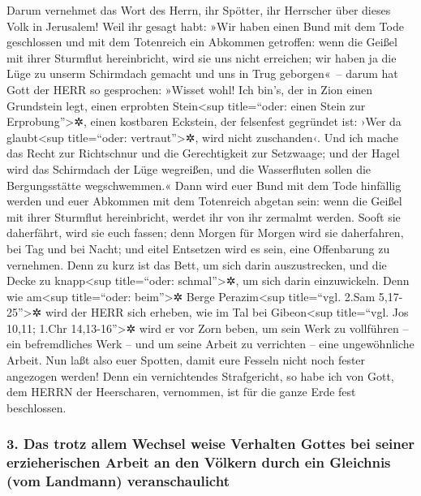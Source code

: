 Darum vernehmet das Wort des Herrn, ihr Spötter, ihr
Herrscher über dieses Volk in Jerusalem! Weil ihr gesagt
habt: »Wir haben einen Bund mit dem Tode geschlossen und mit dem
Totenreich ein Abkommen getroffen: wenn die Geißel mit ihrer Sturmflut
hereinbricht, wird sie uns nicht erreichen; wir haben ja die Lüge zu
unserm Schirmdach gemacht und uns in Trug geborgen«~--
darum hat Gott der HERR so gesprochen: »Wisset wohl! Ich
bin's, der in Zion einen Grundstein legt, einen erprobten
Stein\textless sup title=``oder: einen Stein zur
Erprobung''\textgreater✲, einen kostbaren Eckstein, der felsenfest
gegründet ist: ›Wer da glaubt\textless sup title=``oder:
vertraut''\textgreater✲, wird nicht zuschanden‹. Und ich
mache das Recht zur Richtschnur und die Gerechtigkeit zur Setzwaage; und
der Hagel wird das Schirmdach der Lüge wegreißen, und die Wasserfluten
sollen die Bergungsstätte wegschwemmen.« Dann wird euer
Bund mit dem Tode hinfällig werden und euer Abkommen mit dem Totenreich
abgetan sein: wenn die Geißel mit ihrer Sturmflut hereinbricht, werdet
ihr von ihr zermalmt werden. Sooft sie daherfährt, wird
sie euch fassen; denn Morgen für Morgen wird sie daherfahren, bei Tag
und bei Nacht; und eitel Entsetzen wird es sein, eine Offenbarung zu
vernehmen. Denn zu kurz ist das Bett, um sich darin
auszustrecken, und die Decke zu knapp\textless sup title=``oder:
schmal''\textgreater✲, um sich darin einzuwickeln. Denn
wie am\textless sup title=``oder: beim''\textgreater✲ Berge
Perazim\textless sup title=``vgl. 2.Sam 5,17-25''\textgreater✲ wird der
HERR sich erheben, wie im Tal bei Gibeon\textless sup title=``vgl. Jos
10,11; 1.Chr 14,13-16''\textgreater✲ wird er vor Zorn beben, um sein
Werk zu vollführen -- ein befremdliches Werk -- und um seine Arbeit zu
verrichten -- eine ungewöhnliche Arbeit. Nun laßt also
euer Spotten, damit eure Fesseln nicht noch fester angezogen werden!
Denn ein vernichtendes Strafgericht, so habe ich von Gott, dem HERRN der
Heerscharen, vernommen, ist für die ganze Erde fest beschlossen.

\hypertarget{das-trotz-allem-wechsel-weise-verhalten-gottes-bei-seiner-erzieherischen-arbeit-an-den-vuxf6lkern-durch-ein-gleichnis-vom-landmann-veranschaulicht}{%
\subsubsection{3. Das trotz allem Wechsel weise Verhalten Gottes bei
seiner erzieherischen Arbeit an den Völkern durch ein Gleichnis (vom
Landmann)
veranschaulicht}\label{das-trotz-allem-wechsel-weise-verhalten-gottes-bei-seiner-erzieherischen-arbeit-an-den-vuxf6lkern-durch-ein-gleichnis-vom-landmann-veranschaulicht}}


